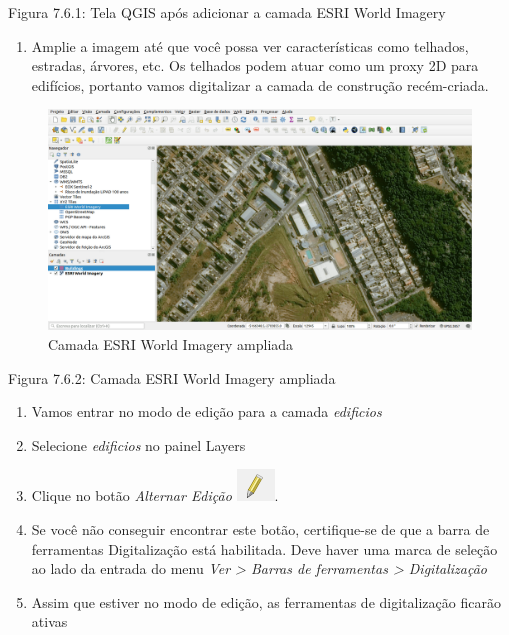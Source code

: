 \documentclass[
]{krantz}
\providecommand{\tightlist}{%
  \setlength{\itemsep}{0pt}\setlength{\parskip}{0pt}}
\begin{document}
Figura 7.6.1: Tela QGIS após adicionar a camada ESRI World Imagery

\begin{enumerate}
\def\labelenumi{\arabic{enumi}.}
\setcounter{enumi}{4}
\tightlist
\item
  Amplie a imagem até que você possa ver características como telhados, estradas, árvores, etc. Os telhados podem atuar como um proxy 2D para edifícios, portanto vamos digitalizar a camada de construção recém-criada.
\end{enumerate}

\begin{figure}
\centering
\includegraphics{media/modulo7/digitize-zoom.png}
\caption{Camada ESRI World Imagery ampliada}
\end{figure}

Figura 7.6.2: Camada ESRI World Imagery ampliada

\begin{enumerate}
\def\labelenumi{\arabic{enumi}.}
\setcounter{enumi}{5}
\tightlist
\item
  Vamos entrar no modo de edição para a camada \emph{edificios}
\item
  Selecione \emph{edificios} no painel Layers
\item
  Clique no botão \emph{Alternar Edição} \includegraphics{media/modulo7/edit-layer.png}.
\item
  Se você não conseguir encontrar este botão, certifique-se de que a barra de ferramentas Digitalização está habilitada. Deve haver uma marca de seleção ao lado da entrada do menu \emph{Ver \textgreater{} Barras de ferramentas \textgreater{} Digitalização}
\item
  Assim que estiver no modo de edição, as ferramentas de digitalização ficarão ativas
\end{enumerate}
\end{document}

